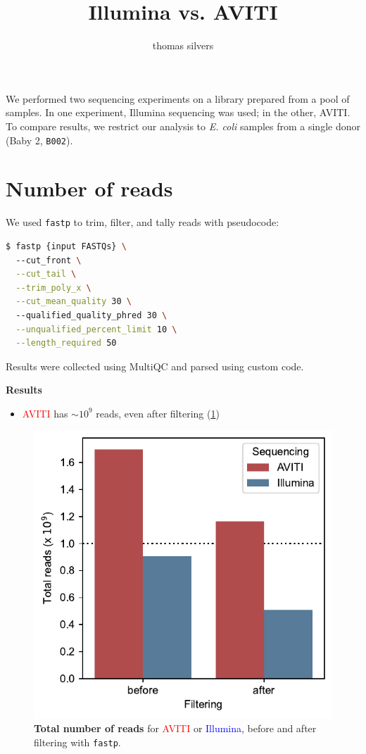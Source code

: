 \documentclass{article}
\title{Illumina vs. AVITI}
\author{thomas silvers}
\begin{document}
\maketitle

We performed two sequencing experiments on a library prepared from a pool of samples. In one experiment, Illumina sequencing was used; in the other, AVITI.
To compare results, we restrict our analysis to \textit{E. coli} samples from a single donor (Baby 2, \texttt{B002}).

\section{Number of reads}

We used \texttt{fastp} to trim, filter, and tally reads with pseudocode:

\begin{lstlisting}[language=bash]
$ fastp {input FASTQs} \ 
  --cut_front \
  --cut_tail \
  --trim_poly_x \
  --cut_mean_quality 30 \ 
  --qualified_quality_phred 30 \
  --unqualified_percent_limit 10 \
  --length_required 50
\end{lstlisting}
    
Results were collected using MultiQC and parsed using custom code.

\textbf{Results}

\begin{itemize}
    \item \textcolor{red}{AVITI} has $\sim 10^9$ reads, even after filtering (\cref{figure:reads})
\end{itemize}

\begin{figure}[H]
    \centering
    \includegraphics[width=.45\textwidth]{figures/total_reads.pdf}
    \caption{
        \textbf{Total number of reads} for \textcolor{red}{AVITI} or \textcolor{blue}{Illumina}, before and after filtering with \texttt{fastp}.
    }
    \label{figure:reads}
\end{figure}
\end{document}

